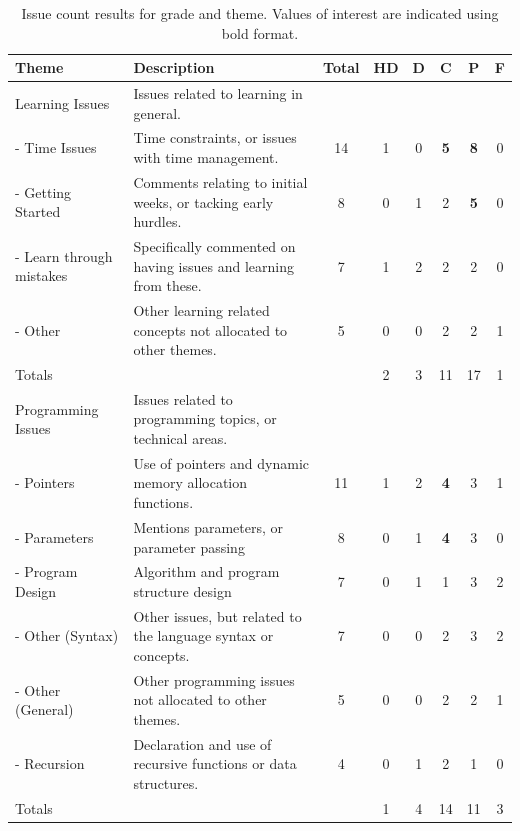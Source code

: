 \begin{table}[htbp]
	  \footnotesize
	  \renewcommand{\arraystretch}{1.3}
	
	\caption{Issue count results for grade and theme. Values of interest are indicated using bold format.}
	\label{tbl:theme_counts}
	\centering
	
    \begin{tabular}{l|p{5cm}|c|c|c|c|c|c}
        Theme                  & Description & Total & HD & D & C  & P  & F \\ \hline \hline
        Learning Issues        & Issues related to learning in general.           & ~    & ~  & ~ & ~ & ~ & ~ \\ %
        - Time Issues            & Time constraints, or issues with time management.           & 14    & 1  & 0 & \textbf{5}  & \textbf{8}  & 0 \\ %
        - Getting Started        & Comments relating to initial weeks, or tacking early hurdles.            & 8     & 0  & 1 & 2  & \textbf{5}  & 0 \\ %
        - Learn through mistakes & Specifically commented on having issues and learning from these.           & 7     & 1  & 2 & 2  & 2  & 0 \\ %
        - Other                  & Other learning related concepts not allocated to other themes.           & 5     & 0  & 0 & 2  & 2  & 1 \\ %
        Totals        & ~           & ~    & 2  & 3 & 11 & 17 & 1 \\ \hline %
        Programming Issues     & Issues related to programming topics, or technical areas.           & ~    & ~  & ~ & ~ & ~ & ~ \\ %
        - Pointers               & Use of pointers and dynamic memory allocation functions.            & 11    & 1  & 2 & \textbf{4}  & 3  & 1 \\ %
        - Parameters             & Mentions parameters, or parameter passing           & 8     & 0  & 1 & \textbf{4}  & 3  & 0 \\ %
        - Program Design         & Algorithm and program structure design           & 7     & 0  & 1 & 1  & 3  & 2 \\ %
        - Other (Syntax)           & Other issues, but related to the language syntax or concepts.           & 7    & 0  & 0 & 2  & 3  & 2 \\ %
        - Other (General)                  & Other programming issues not allocated to other themes.           & 5    & 0  & 0 & 2  & 2  & 1 \\ %
        - Recursion              & Declaration and use of recursive functions or data structures.           & 4    & 0  & 1 & 2  & 1  & 0 \\ %
        Totals     & ~           & ~    & 1  & 4 & 14 & 11 & 3 \\ %
        
	\end{tabular}	
\end{table}

